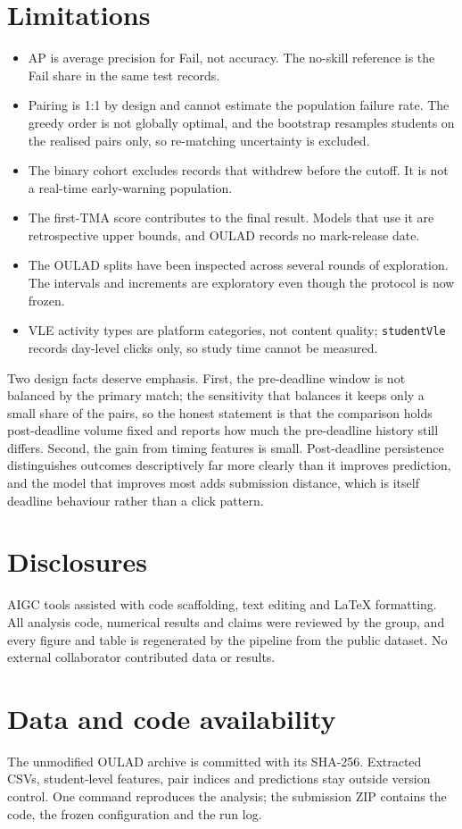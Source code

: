 \documentclass[11pt]{article}
\begin{document}
\section{Limitations}
\begin{itemize}\itemsep2pt
\item AP is average precision for Fail, not accuracy. The no-skill reference is the Fail share in the same test records.
\item Pairing is 1:1 by design and cannot estimate the population failure rate. The greedy order is not globally optimal, and the bootstrap resamples students on the realised pairs only, so re-matching uncertainty is excluded.
\item The binary cohort excludes records that withdrew before the cutoff. It is not a real-time early-warning population.
\item The first-TMA score contributes to the final result. Models that use it are retrospective upper bounds, and OULAD records no mark-release date.
\item The OULAD splits have been inspected across several rounds of exploration. The intervals and increments are exploratory even though the protocol is now frozen.
\item VLE activity types are platform categories, not content quality; \texttt{studentVle} records day-level clicks only, so study time cannot be measured.
\end{itemize}
Two design facts deserve emphasis. First, the pre-deadline window is not balanced by the primary match; the sensitivity that balances it keeps only a small share of the pairs, so the honest statement is that the comparison holds post-deadline volume fixed and reports how much the pre-deadline history still differs. Second, the gain from timing features is small. Post-deadline persistence distinguishes outcomes descriptively far more clearly than it improves prediction, and the model that improves most adds submission distance, which is itself deadline behaviour rather than a click pattern.
\label{endmain}
\section*{Disclosures}
AIGC tools assisted with code scaffolding, text editing and LaTeX formatting. All analysis code, numerical results and claims were reviewed by the group, and every figure and table is regenerated by the pipeline from the public dataset. No external collaborator contributed data or results.
\section*{Data and code availability}
The unmodified OULAD archive is committed with its SHA-256. Extracted CSVs, student-level features, pair indices and predictions stay outside version control. One command reproduces the analysis; the submission ZIP contains the code, the frozen configuration and the run log.
\appendix
\end{document}
